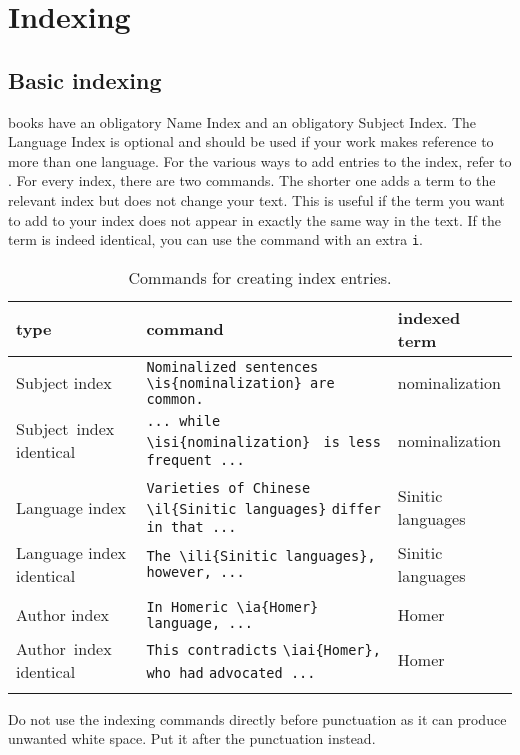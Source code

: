 \chapter{Indexing}
\section{Basic indexing}
\lsp books have an obligatory Name Index and an obligatory Subject Index. The Language Index is optional and should be used if your work makes reference to more than one language. 
For the various ways to add entries to the index, refer to . For every index, there are two commands. The shorter one adds a term to the relevant index but does not change your text. This is useful if the term you want to add to your index does not appear in exactly the same way in the text. If the term is indeed identical, you can use the command with an extra \verb+i+.

\begin{table}[h]
\caption{Commands for creating index entries.}
\label{tab:latex:indexentriese}
 \begin{tabular}{p{1.9cm}>{\small\raggedright}p{6.5cm}l}
  \lsptoprule
  type & \upshape\normalsize command & indexed term \\
  \midrule
  Subject index& \verb+Nominalized sentences+ \verb+\is{nominalization} are+ \verb+common.+ & nomina\-lization \\
  \mbox{Subject index} identical& \verb+... while \isi{nominalization}+ \verb+ is less frequent ...+  & nomina\-lization \\\\
  Language index & \verb+Varieties of Chinese+ \verb+\il{Sinitic languages}+ \verb+differ in that ...+ & Sinitic languages \\
  Language index identical& \verb+The \ili{Sinitic languages},+ \verb+however, ... + & Sinitic languages \\\\
  Author index & \verb+In Homeric \ia{Homer}+ \verb+language, ... + & Homer\\
  \mbox{Author index} identical & \verb+This contradicts+ \verb+\iai{Homer}, who had+ \verb+advocated ...+ & Homer \\
  \lspbottomrule
 \end{tabular}
\end{table}

Do not use the indexing commands directly before punctuation as it can produce unwanted white space. Put it after the punctuation instead.

